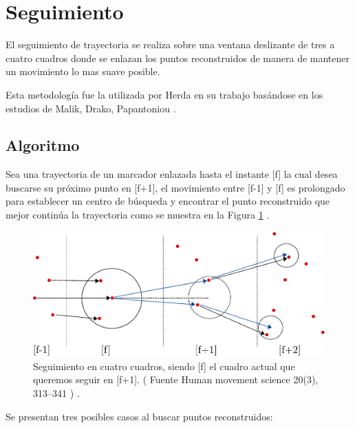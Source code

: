 \section{Seguimiento}

El seguimiento de trayectoria se realiza sobre una ventana deslizante de tres a cuatro cuadros donde se enlazan los puntos reconstruidos de manera de mantener un movimiento lo mas suave posible.

Esta metodología fue la utilizada por Herda \cite{herda} en su trabajo basándose en los estudios de Malik, Drako, Papantoniou \cite{griegos} .

\subsection{Algoritmo}

Sea una trayectoria de un marcador enlazada hasta el instante [f] la cual desea buscarse su próximo punto en [f+1], el movimiento entre [f-1] y [f] es prolongado para establecer un centro de búsqueda y encontrar el punto reconstruido que mejor continúa la trayectoria como se muestra en la Figura \ref{herda_00} .

\begin{figure}[ht!]
\begin{center}
\includegraphics[scale=0.4]{imagenes/Seguimiento/tracking-eps-converted-to.pdf}
\end{center}
\caption{Seguimiento en cuatro cuadros, siendo [f] el cuadro actual que queremos seguir en [f+1]. ( Fuente  Human movement
science 20(3), 313–341 \cite{herda} ) .}
\label{herda_00}
\end{figure}

Se presentan tres posibles casos al buscar puntos reconstruidos:

